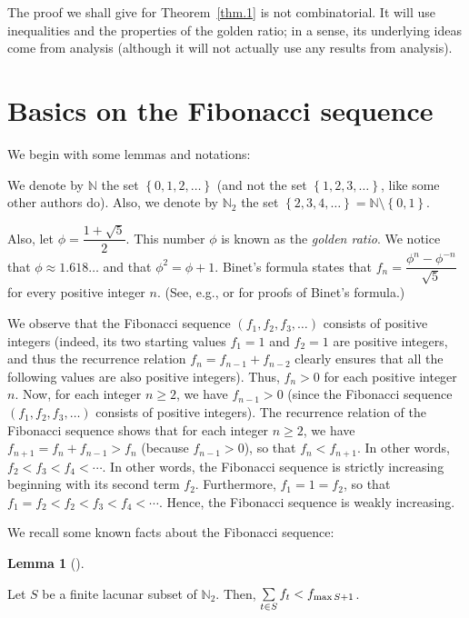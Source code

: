\documentclass[numbers=enddot,12pt,final,onecolumn,notitlepage]{scrartcl}%
\numberwithin{exer}{section}
\theoremstyle{definition}
\newtheorem{lem}[theo]{Lemma}
\newenvironment{lemma}[1][]
{\begin{lem}[#1]\begin{leftbar}}
{\end{leftbar}\end{lem}}
\let\sumnonlimits\sum
\renewcommand{\sum}{\sumnonlimits\limits}
\begin{document}
The proof we shall give for Theorem~\ref{thm.1} is not combinatorial. It will
use inequalities and the properties of the golden ratio; in a sense, its
underlying ideas come from analysis (although it will not actually use any
results from analysis).

\section{Basics on the Fibonacci sequence}

We begin with some lemmas and notations:

We denote by $\mathbb{N}$ the set $\left\{  0,1,2,\ldots\right\}  $ (and not
the set $\left\{  1,2,3,\ldots\right\}  $, like some other authors do). Also,
we denote by $\mathbb{N}_{2}$ the set $\left\{  2,3,4,\ldots\right\}
=\mathbb{N}\setminus\left\{  0,1\right\}  $.

Also, let $\phi=\dfrac{1+\sqrt{5}}{2}$. This number $\phi$ is known as the
\textit{golden ratio}. We notice that $\phi\approx1.618\ldots$ and that
$\phi^{2}=\phi+1$. Binet's formula states that $f_{n}=\dfrac{\phi^{n}%
-\phi^{-n}}{\sqrt{5}}$ for every positive integer $n$. (See, e.g.,
\cite[Identity 240]{BenQui03} or \cite[(1.20)]{Vorobi02} for proofs of Binet's formula.)

We observe that the Fibonacci sequence $\left(  f_{1},f_{2},f_{3}%
,\ldots\right)  $ consists of positive integers (indeed, its two starting
values $f_{1}=1$ and $f_{2}=1$ are positive integers, and thus the recurrence
relation $f_{n}=f_{n-1}+f_{n-2}$ clearly ensures that all the following values
are also positive integers). Thus, $f_{n} > 0$ for each positive integer $n$.
Now, for each integer $n \geq2$, we have $f_{n-1} > 0$ (since the Fibonacci
sequence $\left(  f_{1},f_{2},f_{3},\ldots\right)  $ consists of positive
integers). The recurrence relation of the Fibonacci sequence shows that for
each integer $n \geq2$, we have $f_{n+1} = f_{n} + f_{n-1} > f_{n}$ (because
$f_{n-1} > 0$), so that $f_{n} < f_{n+1}$. In other words, $f_{2} < f_{3} <
f_{4} < \cdots$. In other words, the Fibonacci sequence is strictly increasing
beginning with its second term $f_{2}$. Furthermore, $f_{1} = 1 = f_{2}$, so
that $f_{1} = f_{2} < f_{2} < f_{3} < f_{4} < \cdots$. Hence, the Fibonacci
sequence is weakly increasing.

We recall some known facts about the Fibonacci sequence:

\begin{lemma}
\label{lem.2} Let $S$ be a finite lacunar subset of $\mathbb{N}_{2}$. Then,
$\sum\limits_{t\in S}f_{t}<f_{\max S+1}$.
\end{lemma}
\end{document}
